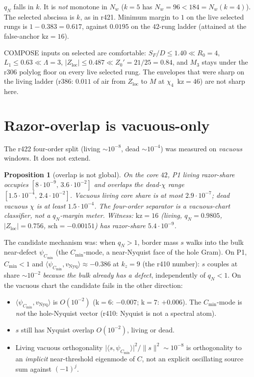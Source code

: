 \documentclass[11pt]{article}
\newtheorem{prop}{Proposition}
\theoremstyle{remark}
\newcommand{\Zloc}{Z_{\mathrm{loc}}}
\newcommand{\Cmin}{C_{\min}}
\begin{document}
$q_N$ falls in $k$.
It is \emph{not} monotone in $N_w$
($k=5$ has $N_w=96<184=N_w(k=4)$).
The selected abscissa is $k$, as in r421.
Minimum margin to $1$ on the live selected
rungs is $1-0.383=0.617$, against
$0.0195$ on the $42$-rung ladder
(attained at the false-anchor $\mathrm{kz}=16$).

COMPOSE inputs on selected are comfortable:
$S_F/D\le 1.40\ll R_0=4$,
$L_1\le 0.63\ll\Lambda=3$,
$\lvert\Zloc\rvert\le 0.487\ll Z_0'=21/25=0.84$,
and $M_3$ stays under the r306 polylog floor
on every live selected rung.
The envelopes that were sharp on the living
ladder (r386: $0.011$ of air from $\Zloc$ to $M$
at $\chi_4$~$\mathrm{kz}=46$) are not sharp here.

\section{Razor-overlap is vacuous-only}\label{sec:ov}

The r422 four-order split
(living $\sim 10^{-8}$, dead $\sim 10^{-4}$)
was measured on \emph{vacuous} windows.
It does not extend.

\begin{prop}[overlap is not global]\label{prop:ov}
On the core $42$, P1 living razor-share occupies
$[8\cdot 10^{-9},\,3.6\cdot 10^{-2}]$
and overlaps the dead-$\chi$ range
$[1.5\cdot 10^{-4},\,2.4\cdot 10^{-2}]$.
Vacuous living core share is at most $2.9\cdot 10^{-7}$;
dead vacuous $\chi$ is at least $1.5\cdot 10^{-4}$.
The four-order separator is a vacuous-chart
classifier, not a $q_N$-margin meter.
Witness: $\mathrm{kz}=16$ (living, $q_N=0.9805$,
$\lvert\Zloc\rvert=0.756$, $\mathrm{sch}=-0.00151$)
has razor-share $5.4\cdot 10^{-9}$.
\end{prop}

The candidate mechanism was: when $q_N>1$,
border mass $s$ walks into the bulk near-defect
$\psi_{\Cmin}$ (the $C_{\min}$-mode, a
near-Nyquist face of the hole Gram).
On P1, $\Cmin<1$ and
$\langle\psi_{\Cmin},v_{\mathrm{Nyq}}\rangle\approx-0.386$
at $k_z=9$ (the r410 number): $s$ couples at
share $\sim 10^{-2}$ \emph{because the bulk already
has a defect}, independently of $q_N<1$.
On the vacuous chart the candidate fails in
the other direction:

\begin{itemize}
\item $\langle\psi_{\Cmin},v_{\mathrm{Nyq}}\rangle$
is $O(10^{-2})$ (k$=6$: $-0.007$; k$=7$: $+0.006$).
The $C_{\min}$-mode is \emph{not} the hole-Nyquist
vector (r410: Nyquist is not a spectral atom).
\item $s$ still has Nyquist overlap $O(10^{-2})$,
living or dead.
\item Living vacuous orthogonality
$\lvert\langle s,\psi_{\Cmin}\rangle\rvert^2/\lVert s\rVert^2\sim 10^{-8}$
is orthogonality to an \emph{implicit} near-threshold
eigenmode of $C$, not an explicit oscillating
source sum against $(-1)^j$.
\end{itemize}
\end{document}
